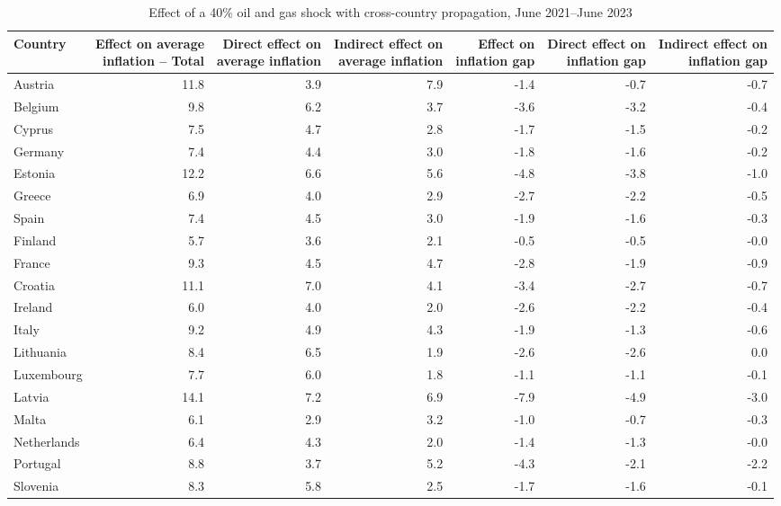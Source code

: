\documentclass[11pt]{article}
\begin{document}
\setcounter{table}{2}
\begin{table}[H]
\centering
\caption{Effect of a 40\% oil and gas shock with cross-country propagation, June 2021--June 2023}
\label{tab:shock-oil-gas-chain-ea20}
\scriptsize
\setlength{\tabcolsep}{1.2pt}
\begin{tabular}{lrrrrrr}
\toprule
Country & \shortstack{Effect on average\\inflation -- Total} & \shortstack{Direct effect on\\average inflation} & \shortstack{Indirect effect on\\average inflation} & \shortstack{Effect on\\inflation gap} & \shortstack{Direct effect on\\inflation gap} & \shortstack{Indirect effect on\\inflation gap}
 \\
\midrule
Austria & 11.8 & 3.9 & 7.9 & -1.4 & -0.7 & -0.7
 \\
Belgium & 9.8 & 6.2 & 3.7 & -3.6 & -3.2 & -0.4
 \\
Cyprus & 7.5 & 4.7 & 2.8 & -1.7 & -1.5 & -0.2
 \\
Germany & 7.4 & 4.4 & 3.0 & -1.8 & -1.6 & -0.2
 \\
Estonia & 12.2 & 6.6 & 5.6 & -4.8 & -3.8 & -1.0
 \\
Greece & 6.9 & 4.0 & 2.9 & -2.7 & -2.2 & -0.5
 \\
Spain & 7.4 & 4.5 & 3.0 & -1.9 & -1.6 & -0.3
 \\
Finland & 5.7 & 3.6 & 2.1 & -0.5 & -0.5 & -0.0
 \\
France & 9.3 & 4.5 & 4.7 & -2.8 & -1.9 & -0.9
 \\
Croatia & 11.1 & 7.0 & 4.1 & -3.4 & -2.7 & -0.7
 \\
Ireland & 6.0 & 4.0 & 2.0 & -2.6 & -2.2 & -0.4
 \\
Italy & 9.2 & 4.9 & 4.3 & -1.9 & -1.3 & -0.6
 \\
Lithuania & 8.4 & 6.5 & 1.9 & -2.6 & -2.6 & 0.0
 \\
Luxembourg & 7.7 & 6.0 & 1.8 & -1.1 & -1.1 & -0.1
 \\
Latvia & 14.1 & 7.2 & 6.9 & -7.9 & -4.9 & -3.0
 \\
Malta & 6.1 & 2.9 & 3.2 & -1.0 & -0.7 & -0.3
 \\
Netherlands & 6.4 & 4.3 & 2.0 & -1.4 & -1.3 & -0.0
 \\
Portugal & 8.8 & 3.7 & 5.2 & -4.3 & -2.1 & -2.2
 \\
Slovenia & 8.3 & 5.8 & 2.5 & -1.7 & -1.6 & -0.1

\end{tabular}
\end{table}
\end{document}
